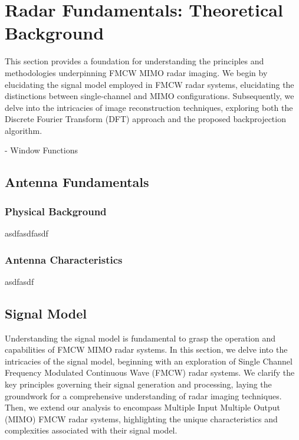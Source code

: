 \chapter{Radar Fundamentals: Theoretical Background}
This section provides a foundation for understanding the principles and methodologies underpinning FMCW MIMO radar imaging.
We begin by elucidating the signal model employed in FMCW radar systems, elucidating the distinctions between single-channel and MIMO configurations.
Subsequently, we delve into the intricacies of image reconstruction techniques,
exploring both the Discrete Fourier Transform (DFT) approach and the proposed backprojection algorithm.

- Window Functions
\section{Antenna Fundamentals}
\subsection{Physical Background}
asdfasdfasdf
\subsection{Antenna Characteristics}
asdfasdf
\section{Signal Model}
Understanding the signal model is fundamental to grasp the operation and capabilities of FMCW MIMO radar systems.
In this section, we delve into the intricacies of the signal model,
beginning with an exploration of Single Channel Frequency Modulated Continuous Wave (FMCW) radar systems.
We clarify the key principles governing their signal generation and processing,
laying the groundwork for a comprehensive understanding of radar imaging techniques.
Then, we extend our analysis to encompass Multiple Input Multiple Output (MIMO) FMCW radar systems,
highlighting the unique characteristics and complexities associated with their signal model.


